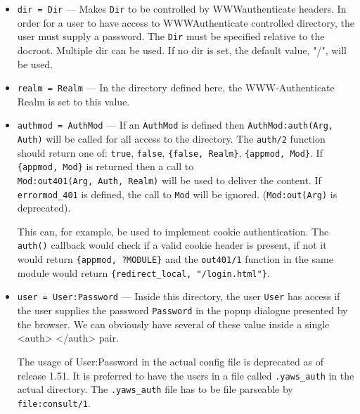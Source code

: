 \documentclass[11pt,oneside,english]{book}
\begin{document}
\begin{itemize}
\begin{itemize}
              \item \verb+dir = Dir+ --- Makes \verb+Dir+ to be controlled by
                WWW\-authenticate headers. In order for a user to have access to
                WWW\-Authenticate controlled directory, the user must supply a
                password. The \verb+Dir+ must be specified relative to the
                docroot. Multiple dir can be used. If no dir is set, the default
                value, "/", will be used.

              \item \verb+realm = Realm+ --- In the directory defined here, the
                WWW-Authenticate Realm is set to this value.

              \item \verb+authmod = AuthMod+ --- If an \verb+AuthMod+ is defined
                then \verb+AuthMod:auth(Arg, Auth)+ will be called for all
                access to the directory. The \verb+auth/2+ function should
                return one of: \verb+true+, \verb+false+, \verb+{false, Realm}+,
                \verb+{appmod, Mod}+. If \verb+{appmod, Mod}+ is returned then a
                call to\\ \verb+Mod:out401(Arg, Auth, Realm)+ will be used to
                deliver the content. If \verb+errormod_401+ is defined, the call
                to \verb+Mod+ will be ignored. (\verb+Mod:out(Arg)+ is
                deprecated).

                This can, for example, be used to implement cookie
                authentication. The \verb+auth()+ callback would check if a
                valid cookie header is present, if not it would return
                \verb+{appmod, ?MODULE}+ and the \verb+out401/1+ function in the
                same module would return \verb+{redirect_local, "/login.html"}+.

              \item \verb+user = User:Password+ --- Inside this directory, the
                user \verb+User+ has access if the user supplies the password
                \verb+Password+ in the popup dialogue presented by the browser.
                We can obviously have several of these value inside a single
                <auth> </auth> pair.

                The usage of User:Password in the actual config file is
                deprecated as of release 1.51. It is preferred to have the users
                in a file called \verb+.yaws_auth+ in the actual directory. The
                \verb+.yaws_auth+ file has to be file parseable by
                \verb+file:consult/1+.


\end{itemize}
\end{itemize}
\end{document}
